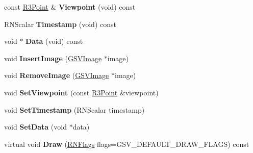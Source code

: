 \begin{DoxyCompactItemize}
\item 
const \hyperlink{class_r3_point}{R3\+Point} \& {\bfseries Viewpoint} (void) const \hypertarget{class_g_s_v_panorama_a186b389bd1eb14c6239f412d84b38700}{}\label{class_g_s_v_panorama_a186b389bd1eb14c6239f412d84b38700}

\item 
R\+N\+Scalar {\bfseries Timestamp} (void) const \hypertarget{class_g_s_v_panorama_a495245191b984a3724644e776015f6ea}{}\label{class_g_s_v_panorama_a495245191b984a3724644e776015f6ea}

\item 
void $\ast$ {\bfseries Data} (void) const \hypertarget{class_g_s_v_panorama_ae7419f220b95eb0401c5a7ca66f530d4}{}\label{class_g_s_v_panorama_ae7419f220b95eb0401c5a7ca66f530d4}

\item 
void {\bfseries Insert\+Image} (\hyperlink{class_g_s_v_image}{G\+S\+V\+Image} $\ast$image)\hypertarget{class_g_s_v_panorama_a7c0115455425fa77fb4c15fde8b61bc0}{}\label{class_g_s_v_panorama_a7c0115455425fa77fb4c15fde8b61bc0}

\item 
void {\bfseries Remove\+Image} (\hyperlink{class_g_s_v_image}{G\+S\+V\+Image} $\ast$image)\hypertarget{class_g_s_v_panorama_a5c7ccdf49fff0decaf6d2b6da7fa22c2}{}\label{class_g_s_v_panorama_a5c7ccdf49fff0decaf6d2b6da7fa22c2}

\item 
void {\bfseries Set\+Viewpoint} (const \hyperlink{class_r3_point}{R3\+Point} \&viewpoint)\hypertarget{class_g_s_v_panorama_a1f8b29f2deb1f96fc1f5876e7eaeb8cd}{}\label{class_g_s_v_panorama_a1f8b29f2deb1f96fc1f5876e7eaeb8cd}

\item 
void {\bfseries Set\+Timestamp} (R\+N\+Scalar timestamp)\hypertarget{class_g_s_v_panorama_ad32c31d645d92e4a4b3d9a6af21f352b}{}\label{class_g_s_v_panorama_ad32c31d645d92e4a4b3d9a6af21f352b}

\item 
void {\bfseries Set\+Data} (void $\ast$data)\hypertarget{class_g_s_v_panorama_a62c00d3dbe71bacf0473dd6456fb88aa}{}\label{class_g_s_v_panorama_a62c00d3dbe71bacf0473dd6456fb88aa}

\item 
virtual void {\bfseries Draw} (\hyperlink{class_r_n_flags}{R\+N\+Flags} flags=G\+S\+V\+\_\+\+D\+E\+F\+A\+U\+L\+T\+\_\+\+D\+R\+A\+W\+\_\+\+F\+L\+A\+GS) const \hypertarget{class_g_s_v_panorama_a96249e8420043b26f23c22e524a26572}{}\label{class_g_s_v_panorama_a96249e8420043b26f23c22e524a26572}


\end{DoxyCompactItemize}
